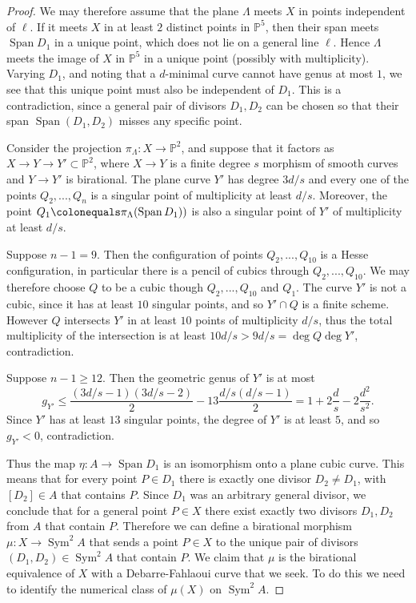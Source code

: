 \documentclass[11pt]{amsart}
\newcommand{\PP}{\mathbb{P}}
\newcommand{\pp}{\mathbb{P}}
\DeclareMathOperator{\Sym}{Sym}
\newcommand{\Span}{\operatorname{Span}}
\theoremstyle{definition}
\theoremstyle{remark}
\begin{document}
\begin{proof}
We may therefore assume that the plane \(\Lambda\) meets \(X\) in points independent of \(\ell\).  If it meets \(X\) in at least \(2\) distinct points in \(\pp^5\), then their span meets \(\Span D_1\) in a unique point, which does not lie on a general line \(\ell\).  Hence \(\Lambda\) meets the image of \(X\) in \(\pp^5\) in a unique point (possibly with multiplicity).  Varying \(D_1\), and noting that a \(d\)-minimal curve cannot have genus at most \(1\), we see that this unique point must also be independent of \(D_1\).  This is a contradiction, since a general pair of divisors \(D_1, D_2\) can be chosen so that their span \(\Span(D_1, D_2)\) misses any specific point.


        Consider the projection $\pi_\Lambda\colon X \to \PP^2$, and suppose that it factors as $X \to Y \to Y' \subset \PP^2$, where $X \to Y$ is a finite degree $s$ morphism of smooth curves and $Y \to Y'$ is birational. The plane curve $Y'$ has degree $3d/s$ and every one of the
        points $Q_2, ..., Q_n$ is a singular point of multiplicity at least $d/s$. Moreover, the point $Q_1\colonequals \pi_\Lambda(\Span D_1))$ is also a singular point of $Y'$ of multiplicity at least $d/s$.
        
        Suppose $n-1=9$. Then the configuration of points $Q_2, ..., Q_{10}$ is a Hesse configuration, in particular there is a pencil of cubics through $Q_2,..., Q_{10}$. We may therefore choose $Q$ to be a cubic though $Q_2, ..., Q_{10}$ and $Q_1$. The curve $Y'$ is not a cubic, since it has at least $10$ singular points, and so $Y' \cap Q$ is a finite scheme. However $Q$ intersects $Y'$ in at least $10$ points of multiplicity $d/s$, thus the total multiplicity of the intersection is at least $10d/s > 9d/s=\deg Q \deg Y'$, contradiction.
        
        Suppose $n-1 \geqslant 12$. Then the geometric genus of $Y'$ is at most 
        \[g_{Y'} \leqslant \frac{(3d/s - 1)(3d/s -2 )}{2} - 13 \frac{d/s(d/s-1)}{2}=1+ 2 \frac{d}{s} - 2\frac{d^2}{s^2}.\]
        Since $Y'$ has at least $13$ singular points, the degree of $Y'$ is at least $5$, and so $g_{Y'}<0$, contradiction.
     

\medskip

Thus the map $\eta\colon A \to \Span D_1$ is an isomorphism onto a plane cubic curve. This means that for every point $P \in D_1$ there is exactly one divisor $D_2 \neq D_1$, with $[D_2] \in A$ that contains $P$. Since $D_1$ was an arbitrary general divisor, we conclude that for a general point $P \in X$ there exist exactly two divisors $D_1,D_2$ from $A$ that contain $P$. Therefore we can define a birational morphism $\mu\colon X \to \Sym^2 A$ that sends a point $P \in X$ to the unique pair of divisors $(D_1, D_2) \in \Sym^2 A$ that contain $P$. We claim that $\mu$ is the birational equivalence of $X$ with a Debarre-Fahlaoui curve that we seek. To do this we need to identify the numerical class of $\mu(X)$ on $\Sym^2 A$. 


\end{proof}
\end{document}
